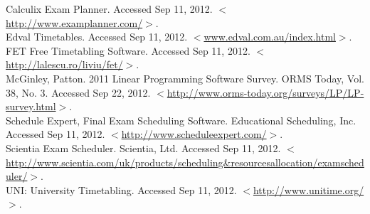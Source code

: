 \documentclass[11pt]{article}
\begin{document}
Calculix Exam Planner. Accessed Sep 11, 2012. $<$\url{http://www.examplanner.com/}$>$. \\

Edval Timetables. Accessed Sep 11, 2012. $<$\url{www.edval.com.au/index.html}$>$. \\


FET Free Timetabling Software. Accessed Sep 11, 2012. $<$\url{http://lalescu.ro/liviu/fet/}$>$.\\

McGinley,  Patton. 2011 Linear Programming Software Survey. ORMS Today, Vol. 38, No. 3.  Accessed Sep 22, 2012. $<$\url{http://www.orms-today.org/surveys/LP/LP-survey.html}$>$. \\

Schedule Expert, Final Exam Scheduling Software. Educational Scheduling, Inc. Accessed Sep 11, 2012. $<$\url{http://www.scheduleexpert.com/}$>$. \\

Scientia Exam Scheduler. Scientia, Ltd. Accessed Sep 11, 2012.
$<$\url{http://www.scientia.com/uk/products/scheduling&resourcesallocation/examscheduler/}$>$. \\

UNI: University Timetabling. Accessed Sep 11, 2012.  $<$\url{http://www.unitime.org/}$>$.
\end{document}

